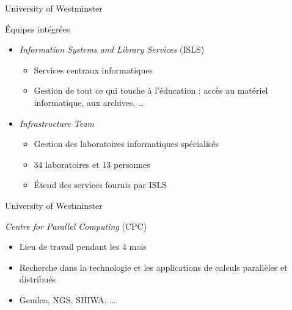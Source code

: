 \begin{frame}{University of Westminster}
	\begin{block}{\'Equipes int\'egr\'ees}
		\begin{itemize}
			\item \textit{Information Systems and Library Services} (ISLS)
			\begin{itemize}
				\item Services centraux informatiques
				\item Gestion de tout ce qui touche \`a l'\'education : acc\`es au mat\'eriel  informatique, aux archives, \ldots

			\end{itemize}

			\item \textit{Infrastructure Team}
			\begin{itemize}
				\item Gestion des laboratoires informatiques sp\'ecialis\'es
				\item 34 laboratoires et 13 personnes
				\item \'Etend des services fournis par ISLS

			\end{itemize}

		\end{itemize}

	\end{block}

\end{frame}


\begin{frame}{University of Westminster}
	\begin{block}{\textit{Centre for Parallel Computing}  (CPC)}
		\begin{itemize}
			\item Lieu de travail pendant les 4 mois
			\item Recherche dans la technologie et les applications de calculs parall\`eles et distribu\'es
			\item Gemlca, NGS, SHIWA, \ldots

		\end{itemize}

	\end{block}

\end{frame}